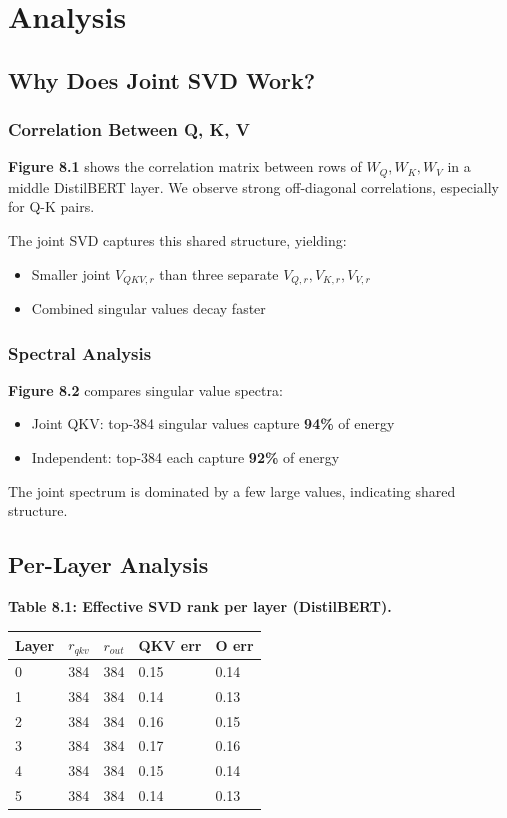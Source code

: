 \section{Analysis}

\subsection{Why Does Joint SVD Work?}

\subsubsection{Correlation Between Q, K, V}

\textbf{Figure 8.1} shows the correlation matrix between rows of $W_Q, W_K, W_V$ 
in a middle DistilBERT layer. We observe strong off-diagonal correlations, 
especially for Q-K pairs.

The joint SVD captures this shared structure, yielding:
\begin{itemize}
\item Smaller joint $V_{QKV, r}$ than three separate $V_{Q,r}, V_{K,r}, V_{V,r}$
\item Combined singular values decay faster

\end{itemize}
\subsubsection{Spectral Analysis}

\textbf{Figure 8.2} compares singular value spectra:
\begin{itemize}
\item Joint QKV: top-384 singular values capture \textbf{94\%} of energy
\item Independent: top-384 each capture \textbf{92\%} of energy

\end{itemize}
The joint spectrum is dominated by a few large values, indicating shared 
structure.

\subsection{Per-Layer Analysis}

\textbf{Table 8.1: Effective SVD rank per layer (DistilBERT).}

\begin{table}[H]
\centering
\small
\begin{tabular}{lllll}
\toprule
\textbf{Layer} & \textbf{$r_{qkv}$} & \textbf{$r_{out}$} & \textbf{QKV err} & \textbf{O err} \\
\midrule
0 & 384 & 384 & 0.15 & 0.14 \\
1 & 384 & 384 & 0.14 & 0.13 \\
2 & 384 & 384 & 0.16 & 0.15 \\
3 & 384 & 384 & 0.17 & 0.16 \\
4 & 384 & 384 & 0.15 & 0.14 \\
5 & 384 & 384 & 0.14 & 0.13 \\
\bottomrule
\end{tabular}
\end{table}

